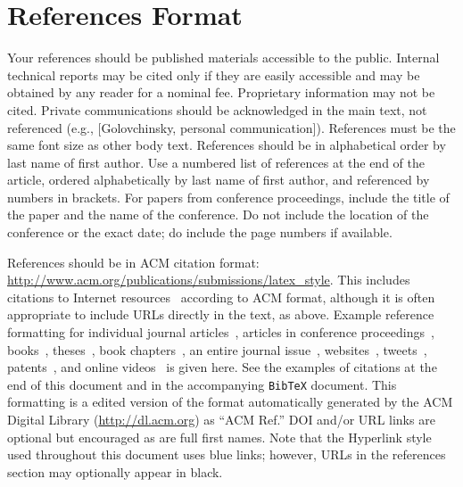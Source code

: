 \documentclass{sigchi}
\begin{document}
\section{References Format}
Your references should be published materials accessible to the
public. Internal technical reports may be cited only if they are
easily accessible and may be obtained by any reader for a nominal
fee. Proprietary information may not be cited. Private communications
should be acknowledged in the main text, not referenced (e.g.,
[Golovchinsky, personal communication]). References must be the same
font size as other body text. References should be in alphabetical
order by last name of first author. Use a numbered list of references
at the end of the article, ordered alphabetically by last name of
first author, and referenced by numbers in brackets. For papers from
conference proceedings, include the title of the paper and the name of
the conference. Do not include the location of the conference or the
exact date; do include the page numbers if available. 

References should be in ACM citation format:
\url{http://www.acm.org/publications/submissions/latex_style}.  This
includes citations to Internet
resources~\cite{CHINOSAUR:venue,cavender:writing,psy:gangnam}
according to ACM format, although it is often appropriate to include
URLs directly in the text, as above. Example reference formatting for
individual journal articles~\cite{ethics}, articles in conference
proceedings~\cite{Klemmer:2002:WSC:503376.503378},
books~\cite{Schwartz:1995:GBF}, theses~\cite{sutherland:sketchpad},
book chapters~\cite{winner:politics}, an entire journal
issue~\cite{kaye:puc},
websites~\cite{acm_categories,cavender:writing},
tweets~\cite{CHINOSAUR:venue}, patents~\cite{heilig:sensorama}, and
online videos~\cite{psy:gangnam} is given here.  See the examples of
citations at the end of this document and in the accompanying
\texttt{BibTeX} document. This formatting is a edited version of the
format automatically generated by the ACM Digital Library
(\url{http://dl.acm.org}) as ``ACM Ref.'' DOI and/or URL links are
optional but encouraged as are full first names. Note that the
Hyperlink style used throughout this document uses blue links;
however, URLs in the references section may optionally appear in
black.



\end{document}
